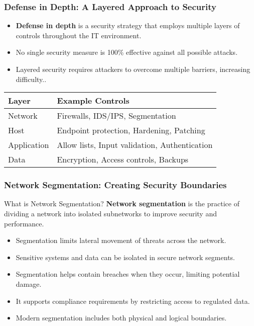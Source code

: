 \documentclass{beamer}
\begin{document}
\begin{frame}
\frametitle{Defense in Depth: A Layered Approach to Security}

\begin{itemize}
\item \textbf{Defense in depth} is a security strategy that employs multiple layers of controls throughout the IT environment.
\item No single security measure is 100\% effective against all possible attacks.
\item Layered security requires attackers to overcome multiple barriers, increasing difficulty..
\end{itemize}

\begin{table}
\begin{tabularx}{\textwidth}{|X|X|}
\hline
\textbf{Layer} & \textbf{Example Controls} \\
\hline
Network & Firewalls, IDS/IPS, Segmentation \\
\hline
Host & Endpoint protection, Hardening, Patching \\
\hline
Application & Allow lists, Input validation, Authentication \\
\hline
Data & Encryption, Access controls, Backups \\
\hline
\end{tabularx}
\end{table}
\end{frame}

\begin{frame}
\frametitle{Network Segmentation: Creating Security Boundaries}

\begin{block}{What is Network Segmentation?}
\textbf{Network segmentation} is the practice of dividing a network into isolated subnetworks to improve security and performance.
\end{block}

\begin{itemize}
\item Segmentation limits lateral movement of threats across the network.
\item Sensitive systems and data can be isolated in secure network segments.
\item Segmentation helps contain breaches when they occur, limiting potential damage.
\item It supports compliance requirements by restricting access to regulated data.
\item Modern segmentation includes both physical and logical boundaries.
\end{itemize}
\end{frame}
\end{document}
